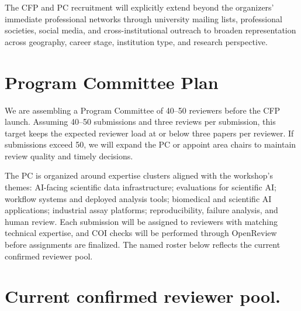 \documentclass[10pt]{article}
\begin{document}
The CFP and PC recruitment will explicitly extend beyond the organizers' immediate professional networks through university mailing lists, professional societies, social media, and cross-institutional outreach to broaden representation across geography, career stage, institution type, and research perspective.

\section{Program Committee Plan}
\label{sec:pc}

We are assembling a Program Committee of 40--50 reviewers before the CFP launch. Assuming 40--50 submissions and three reviews per submission, this target keeps the expected reviewer load at or below three papers per reviewer. If submissions exceed 50, we will expand the PC or appoint area chairs to maintain review quality and timely decisions.

The PC is organized around expertise clusters aligned with the workshop's themes: AI-facing scientific data infrastructure; evaluations for scientific AI; workflow systems and deployed analysis tools; biomedical and scientific AI applications; industrial assay platforms; reproducibility, failure analysis, and human review. Each submission will be assigned to reviewers with matching technical expertise, and COI checks will be performed through OpenReview before assignments are finalized. The named roster below reflects the current confirmed reviewer pool.


\section{Current confirmed reviewer pool.}\par\vspace{2pt}
\end{document}

